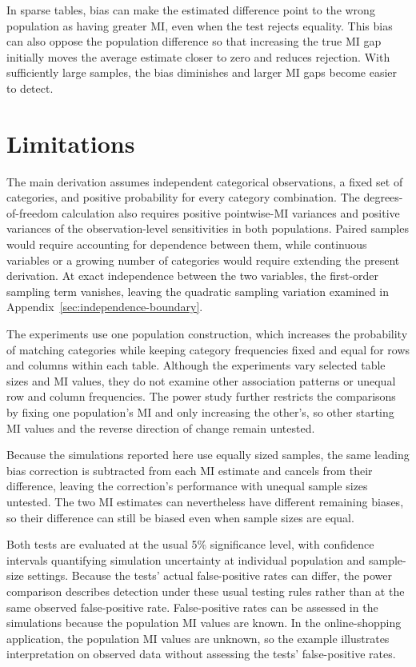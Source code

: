In sparse tables, bias can make the estimated difference point to the wrong
population as having greater MI, even when the test rejects equality.
This bias can also oppose the population difference so that increasing the true
MI gap initially moves the average estimate closer to zero and reduces
rejection. With sufficiently large samples, the bias diminishes and larger
MI gaps become easier to detect.

\section{Limitations}

The main derivation assumes independent categorical observations, a fixed
set of categories, and positive probability for every category combination.
The degrees-of-freedom calculation also requires positive pointwise-MI variances
and positive variances of the observation-level sensitivities in both populations.
Paired samples would require accounting for dependence between
them, while continuous variables or a growing number of categories would
require extending the present derivation. At exact independence between
the two variables, the first-order sampling term vanishes, leaving the
quadratic sampling variation examined in
Appendix~\ref{sec:independence-boundary}.

The experiments use one population construction, which increases the
probability of matching categories while keeping category frequencies fixed
and equal for rows and columns within each table. Although the experiments
vary selected table sizes and MI values, they do not examine other
association patterns or unequal row and column frequencies. The power study
further restricts the comparisons by fixing one population's MI and only
increasing the other's, so other starting MI values and the reverse
direction of change remain untested.

Because the simulations reported here use equally sized samples, the same
leading bias correction is subtracted from each MI estimate and cancels from their
difference, leaving the correction's performance with unequal sample sizes
untested. The two MI estimates can nevertheless have different remaining
biases, so their difference can still be biased even when sample sizes are
equal.

Both tests are evaluated at the usual 5\% significance level, with
confidence intervals quantifying simulation uncertainty at individual
population and sample-size settings. Because the tests' actual
false-positive rates can differ, the power comparison describes detection
under these usual testing rules rather than at the same observed
false-positive rate. False-positive rates can be assessed in the simulations
because the population MI values are known. In the online-shopping application,
the population MI values are unknown, so the example illustrates interpretation
on observed data without assessing the tests' false-positive rates.


